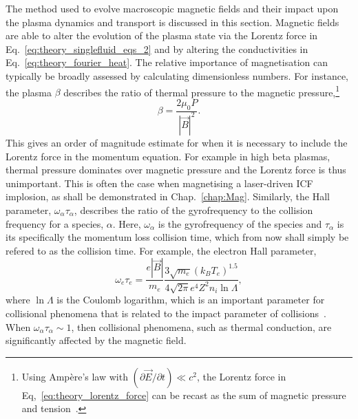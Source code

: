The method used to evolve macroscopic magnetic fields and their impact upon the plasma dynamics and transport is discussed in this section.
Magnetic fields are able to alter the evolution of the plasma state via the Lorentz force in Eq.~\ref{eq:theory_singlefluid_eqs_2} and by altering the conductivities in Eq.~\ref{eq:theory_fourier_heat}.
The relative importance of magnetisation can typically be broadly assessed by calculating dimensionless numbers.
For instance, the plasma $\beta$ describes the ratio of thermal pressure to the magnetic pressure,\footnote{Using Amp\`ere's law with $(\partial \vec{E} / \partial t) \ll c^2$, the Lorentz force in Eq,~\ref{eq:theory_lorentz_force} can be recast as the sum of magnetic pressure and tension~\cite{oneill_modelling_2023}.}
\begin{equation}
    \beta = \frac{2 \mu_0 P}{|\vec{B}|^2}.
\end{equation}
This gives an order of magnitude estimate for when it is necessary to include the Lorentz force in the momentum equation.
For example in high beta plasmas, thermal pressure dominates over magnetic pressure and the Lorentz force is thus unimportant.
This is often the case when magnetising a laser-driven \ac{ICF} implosion, as shall be demonstrated in Chap.~\ref{chap:Mag}.
Similarly, the Hall parameter, $\omega_\alpha \tau_\alpha$, describes the ratio of the gyrofrequency to the collision frequency for a species, $\alpha$.
Here, $\omega_\alpha$ is the gyrofrequency of the species and $\tau_\alpha$ is its specifically the momentum loss collision time, which from now shall simply be refered to as the collision time.
For example, the electron Hall parameter,
\begin{equation}
    \omega_e \tau_e = \frac{e |\vec{B}|}{m_e} \frac{3\sqrt{m_e} (k_B T_e)^{1.5}}{4 \sqrt{2\pi} e^4 Z^2 n_i \ln \Lambda },
\end{equation}
where $\ln\Lambda$ is the Coulomb logarithm, which is an important parameter for collisional phenomena that is related to the impact parameter of collisions~\cite{ramazanov_coulomb_2001,kodanova_investigation_2015,lin_temperature_2023}.
When $\omega_\alpha \tau_\alpha \sim 1$, then collisional phenomena, such as thermal conduction, are significantly affected by the magnetic field.

